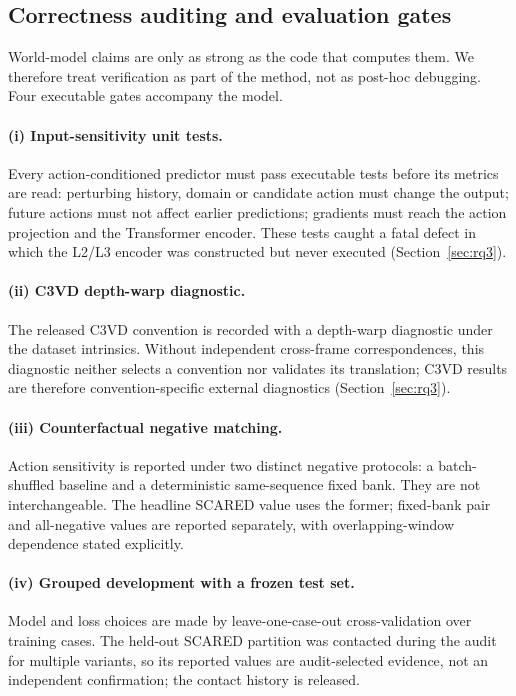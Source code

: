 \documentclass[preprint,12pt]{elsarticle}
\begin{document}
\subsection{Correctness auditing and evaluation gates}
\label{sec:audit}
World-model claims are only as strong as the code that computes them. We
therefore treat verification as part of the method, not as post-hoc
debugging. Four executable gates accompany the model.
\paragraph{(i) Input-sensitivity unit tests.}
Every action-conditioned predictor must pass executable tests before its
metrics are read: perturbing history, domain or candidate action must change
the output; future actions must not affect earlier predictions; gradients must
reach the action projection and the Transformer encoder. These tests caught a
fatal defect in which the L2/L3 encoder was constructed but never executed
(Section~\ref{sec:rq3}).
\paragraph{(ii) C3VD depth-warp diagnostic.}
The released C3VD convention is recorded with a depth-warp diagnostic under
the dataset intrinsics. Without independent cross-frame correspondences, this
diagnostic neither selects a convention nor validates its translation; C3VD
results are therefore convention-specific external diagnostics
(Section~\ref{sec:rq3}).
\paragraph{(iii) Counterfactual negative matching.}
Action sensitivity is reported under two distinct negative protocols: a
batch-shuffled baseline and a deterministic same-sequence fixed bank. They are
not interchangeable. The headline SCARED value uses the former; fixed-bank
pair and all-negative values are reported separately, with overlapping-window
dependence stated explicitly.
\paragraph{(iv) Grouped development with a frozen test set.}
Model and loss choices are made by leave-one-case-out cross-validation over
training cases. The held-out SCARED partition was contacted during the audit
for multiple variants, so its reported values are audit-selected evidence,
not an independent confirmation; the contact history is released.
\end{document}
